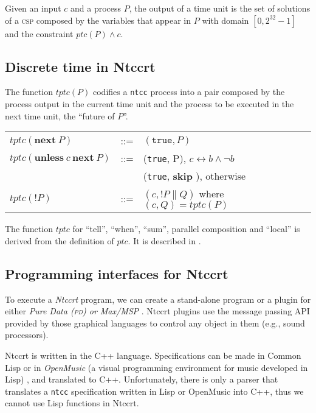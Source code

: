 \documentclass[english]{llncs}
\begin{document}
Given an input $c$ and a process $P$, the output of a time unit is the set of solutions of a \textsc{csp} composed by the variables that appear in $P$ with domain $[0,2^{32}-1]$ and the constraint $ptc(P)\land c$.

\subsection{Discrete time in Ntccrt}
The function $tptc(P)$ codifies a \texttt{ntcc} process into 
a pair composed by the process output in the current time unit and the process to be executed in the next time unit, the ``future of $P$''.

\begin{center}\begin{tabular}{l l l}
$tptc(\textbf{next}\ P)$ &::= &$( \texttt{true}, P )$\\
$tptc(\textbf{unless}\ c\ \textbf{next}\ P)$ &::= &(\texttt{true}, P), $c \leftrightarrow b \wedge \neg b$ \\
                        &&(\texttt{true}, \textbf{skip} ), otherwise  \\
$tptc(\textbf{!}P)$ &::= &$( c, \textbf{!}P \|Q )$  where $(c,Q) =  tptc(P) $\\
\end{tabular}\end{center} 

The function $tptc$ for ``tell'', ``when'', ``sum'', parallel composition and ``local'' is derived from the definition of $ptc$. It is described in \cite{toro-report09}.

\subsection{Programming interfaces for Ntccrt}
To execute a \textit{Ntccrt} program, we can create a stand-alone program or a plugin for either \textit{Pure Data (\textsc{pd}) or Max/MSP} \cite{maxpd}. 
Ntccrt plugins use the message passing API provided by those graphical languages to control any object in them (e.g., sound processors).

Ntccrt is written in the C++ language. Specifications can be made in Common Lisp 
 or in \textit{OpenMusic}  (a visual programming environment for music developed in Lisp) \cite{agon98}, and translated to C++. Unfortunately, there is only a parser that translates a \texttt{ntcc} specification written in Lisp or OpenMusic into C++, thus 
we cannot use Lisp functions in Ntccrt.
\end{document}
